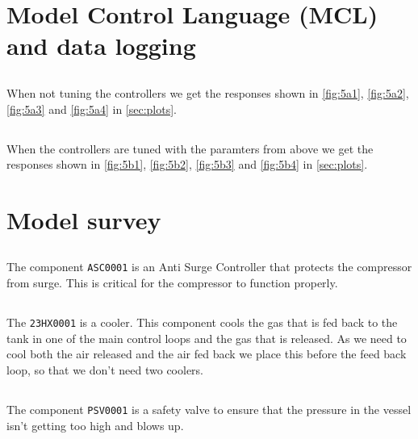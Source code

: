 \documentclass[a4paper]{scrartcl}
\begin{document}
\section{Model Control Language (MCL) and data logging}
\subsection{}
When not tuning the controllers we get the responses shown in \autoref{fig:5a1}, \autoref{fig:5a2}, \autoref{fig:5a3} and \autoref{fig:5a4} in \autoref{sec:plots}.

\subsection{}

When the controllers are tuned with the paramters from above we get the responses shown in \autoref{fig:5b1}, \autoref{fig:5b2}, \autoref{fig:5b3} and \autoref{fig:5b4} in \autoref{sec:plots}.


\section{Model survey}
\subsection{}
The component \texttt{ASC0001} is an Anti Surge Controller that protects the compressor from surge. This is critical for the compressor to function properly.
\subsection{}
The \texttt{23HX0001} is a cooler. This component cools the gas that is fed back to the tank in one of the main control loops and the gas that is released. As we need to cool both the air released and the air fed back we place this before the feed back loop, so that we don't need two coolers.
\subsection{}
The component \texttt{PSV0001} is a safety valve to ensure that the pressure in the vessel isn't getting too high and blows up.

\clearpage
\appendix
\end{document}
